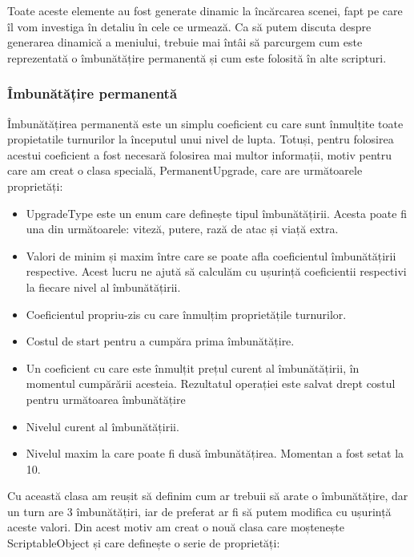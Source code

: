 \documentclass[12pt, a4paper]{article}
\begin{document}
	Toate aceste elemente au fost generate dinamic la încărcarea scenei, fapt pe care îl vom investiga în detaliu în cele ce urmează. Ca să putem discuta despre generarea dinamică a meniului, trebuie mai întâi să parcurgem cum este reprezentată o îmbunătățire permanentă și cum este folosită în alte scripturi.
	
	
	
	
	
	\subsubsection{Îmbunătățire permanentă}
	
	Îmbunătățirea permanentă este un simplu coeficient cu care sunt înmulțite toate propietatile turnurilor la începutul unui nivel de lupta. Totuși, pentru folosirea acestui coeficient a fost necesară folosirea mai multor informații, motiv pentru care am creat o clasa specială, PermanentUpgrade, care are următoarele proprietăți:
	
	\begin{itemize}
		\item UpgradeType este un enum care definește tipul îmbunătățirii. Acesta poate fi una din următoarele: viteză, putere, rază de atac și viață extra.
		\item Valori de minim și maxim între care se poate afla coeficientul îmbunătățirii respective. Acest lucru ne ajută să calculăm cu ușurință coeficientii respectivi la fiecare nivel al îmbunătățirii.
		\item Coeficientul propriu-zis cu care înmulțim proprietățile turnurilor.
		\item Costul de start pentru a cumpăra prima îmbunătățire.
		\item Un coeficient cu care este înmulțit prețul curent al îmbunătățirii, în momentul cumpărării acesteia. Rezultatul operației este salvat drept costul pentru următoarea îmbunătățire
		\item Nivelul curent al îmbunătățirii.
		\item Nivelul maxim la care poate fi dusă îmbunătățirea. Momentan a fost setat la 10.
	\end{itemize}
	
	Cu această clasa am reușit să definim cum ar trebuii să arate o îmbunătățire, dar un turn are 3 îmbunătățiri, iar de preferat ar fi să putem modifica cu ușurință aceste valori. Din acest motiv am creat o nouă clasa care moștenește ScriptableObject și care definește o serie de proprietăți:
	
\end{document}
